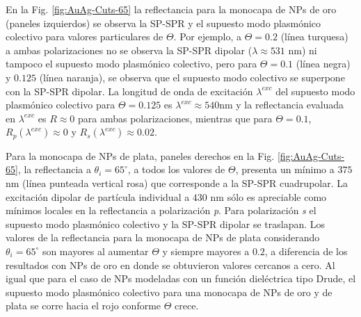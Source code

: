 En la Fig. \ref{fig:AuAg-Cuts-65} la reflectancia  para la monocapa de NPs de oro (paneles izquierdos) se observa la SP-SPR y el supuesto modo plasmónico colectivo para valores particulares de $\Theta$. Por ejemplo, a $\Theta=0.2$  (línea turquesa) a ambas polarizaciones no se observa la SP-SPR dipolar ($\lambda\approx531$ nm) ni tampoco el supuesto modo plasmónico colectivo,  pero  para $\Theta= 0.1$ (línea negra)  y $0.125$ (línea naranja), se observa que el supuesto modo colectivo se superpone con la SP-SPR dipolar. La longitud de onda de excitación $\lambda^{exc}$ del supuesto modo plasmónico colectivo para $\Theta=0.125$ es $\lambda^{exc} \approx 540\text {nm}$ y la reflectancia evaluada en $\lambda^{exc}$ es $R\approx 0$ para ambas polarizaciones,  mientras que  para $\Theta=0.1$,  $R_p(\lambda^{exc}) \approx 0$ y $R_s(\lambda^{exc})\approx 0.02$. %

Para la monocapa de NPs de plata, paneles derechos en la Fig. \ref{fig:AuAg-Cuts-65}, la reflectancia a $\theta_i=65^\circ$, a todos los valores de $\Theta$, presenta un mínimo a $375$ nm (línea punteada vertical rosa) que corresponde a la SP-SPR cuadrupolar. La excitación dipolar de partícula individual a $430$ nm sólo es apreciable como mínimos locales en la reflectancia a polarización \emph{p}. Para polarización \emph{s} el supuesto modo plasmónico colectivo y la SP-SPR dipolar se traslapan. Los valores de la  reflectancia para la monocapa de NPs de plata considerando $\theta_i=65^\circ$ son mayores al aumentar $\Theta$ y siempre mayores a $0.2$, a diferencia de los resultados con NPs de oro en donde se obtuvieron valores cercanos a cero. Al igual que para el caso de NPs modeladas con un función dieléctrica tipo Drude, el supuesto modo plasmónico colectivo para una monocapa de NPs de oro y de plata se corre hacia el rojo conforme $\Theta$ crece.
	
